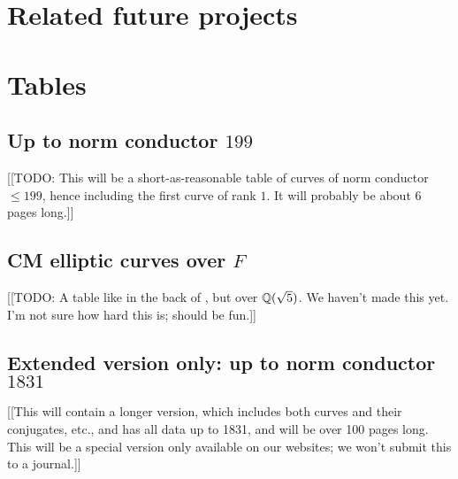 \documentclass{article}
\begin{document}
\section{Related future projects}\label{sec:future}

\section{Tables}\label{sec:tables}

\subsection{Up to norm conductor  $199$}\label{sec:to199}

[[TODO: This will be a short-as-reasonable table of curves of norm
conductor $\leq 199$, hence including the first curve of rank $1$.  It
will probably be about 6 pages long.]]

\subsection{CM elliptic curves over $F$}\label{sec:cm}

[[TODO: A table like in the back of \cite{silverman:aec2}, but over
$\mathbb{Q}(\sqrt{5})$.  We haven't made this yet.  I'm not sure how hard this
is; should be fun.]]

\subsection{Extended version only: up to norm conductor  $1831$}\label{sec:to1831}

[[This will contain a longer version, which includes both curves and
their conjugates, etc., and has all data up to 1831, and will be over
100 pages long.  This will be a special version only available on our
websites; we won't submit this to a journal.]]




\end{document}
